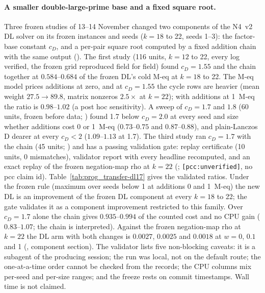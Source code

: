 \paragraph{A smaller double-large-prime base and a fixed square root.} Three
frozen studies of 13--14 November changed two components of the N4~v2 DL
solver on its frozen instances and seeds ($k=18$ to 22, seeds 1--3): the
factor-base constant $c_D$, and a per-pair square root computed by a fixed
addition chain with the same output
(). The first study
(116 units, $k=12$ to 22, every log verified, the frozen grid reproduced
field for field) found $c_D=1.55$ and the chain together at $0.584$--$0.684$
of the frozen DL's cold M-eq at $k=18$ to 22. The M-eq model prices
additions at zero, and at $c_D=1.55$ the cycle rows are heavier (mean weight
$27.5\to89.8$, matrix nonzeros $2.5\times$ at $k=22$); with additions at
1~M-eq the ratio is $0.98$--$1.02$ (a post hoc sensitivity). A sweep of
$c_D=1.7$ and $1.8$ (60 units, frozen before data;
) found 1.7
below $c_D=2.0$ at every seed and size whether additions cost 0 or
1~M-eq ($0.73$--$0.75$ and $0.87$--$0.88$), and plain-Lanczos D dearer at
every $c_D<2$ ($1.09$--$1.13$ at 1.7). The third study ran $c_D=1.7$ with the
chain (45 units; )
and has a passing validation gate: replay certificate (10 units, 0
mismatches), validator report with every headline recomputed, and an exact
replay of the frozen negation-map rho at $k=22$
(;
\texttt{[pcc:unverified]}, no pcc claim id).
Table~\ref{tab:prog_transfer-dl17} gives the validated ratios. Under the
frozen rule (maximum over seeds below 1 at additions 0 and 1~M-eq) the new
DL is an improvement of the frozen DL component at every $k=18$ to 22; the
gate validates it as a component improvement restricted to this family. Over
$c_D=1.7$ alone the chain gives $0.935$--$0.994$ of the counted cost and no
CPU gain ($0.83$--$1.07$; the chain is interpreted). Against the
frozen negation-map rho at $k=22$ the DL arm with both changes is $0.0027$,
$0.0025$ and $0.0018$ at $w=0$, $0.1$ and 1 (,
component section). The validator lists five non-blocking caveats: it is a
subagent of the producing session; the run was local, not on the default
route; the one-at-a-time order cannot be checked from the records; the CPU
columns mix per-seed and per-size ranges; and the freeze rests on commit
timestamps. Wall time is not claimed.

